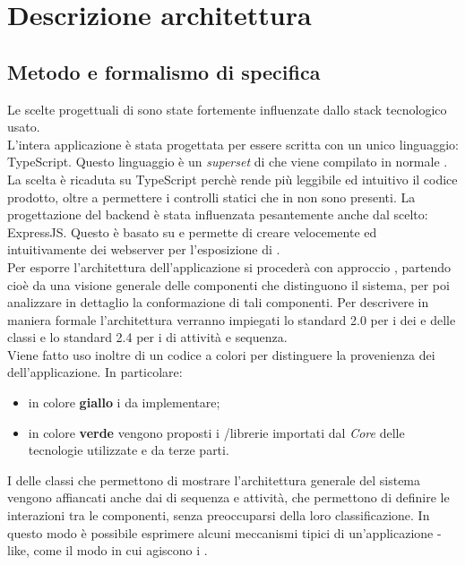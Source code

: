 \newpage
\section{Descrizione architettura}
\subsection{Metodo e formalismo di specifica}
Le scelte progettuali di  sono state fortemente influenzate dallo stack tecnologico usato. \\
L'intera applicazione è stata progettata per essere scritta con un unico linguaggio: TypeScript. Questo linguaggio è un \textit{superset} di  che viene compilato in normale . La scelta è ricaduta su TypeScript perchè rende più leggibile ed intuitivo il codice prodotto, oltre a permettere i controlli statici che in  non sono presenti.
La progettazione del backend è stata influenzata pesantemente anche dal  scelto: ExpressJS. Questo  è basato su  e permette di creare velocemente ed intuitivamente dei webserver per l'esposizione di  . \\
Per esporre l'architettura dell'applicazione si procederà con approccio , partendo cioè da una visione generale delle componenti che distinguono il sistema, per poi analizzare in dettaglio la conformazione di tali componenti. Per descrivere in maniera formale l'architettura verranno impiegati lo standard  2.0 per i  dei  e delle classi e lo standard  2.4 per i  di attività e sequenza. \\

Viene fatto uso inoltre di un codice a colori per distinguere la provenienza dei  dell'applicazione. In particolare:
\begin{itemize}
\item in colore \textbf{giallo} i  da implementare;
\item in colore \textbf{verde} vengono proposti i /librerie importati dal \textit{Core} delle tecnologie utilizzate e da terze parti.
\end{itemize}

I  delle classi che permettono di mostrare l'architettura generale del sistema vengono affiancati anche dai  di sequenza e attività, che permettono di definire le interazioni tra le componenti, senza preoccuparsi della loro classificazione. In questo modo è possibile esprimere alcuni meccanismi tipici di un'applicazione -like, come il modo in cui agiscono i . 

